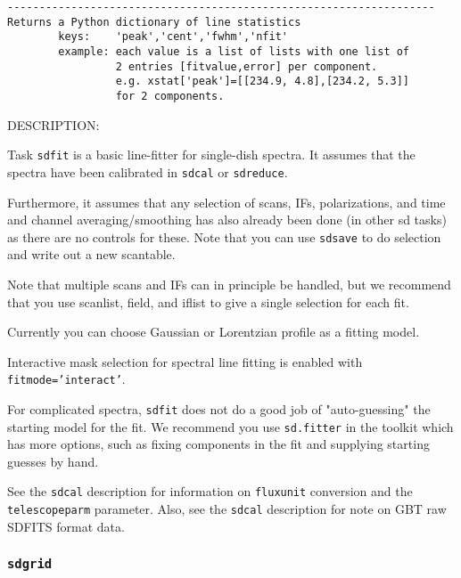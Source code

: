 \begin{verbatim}
-------------------------------------------------------------------
Returns a Python dictionary of line statistics
        keys:    'peak','cent','fwhm','nfit'
        example: each value is a list of lists with one list of
                 2 entries [fitvalue,error] per component.
                 e.g. xstat['peak']=[[234.9, 4.8],[234.2, 5.3]]
                 for 2 components.

\end{verbatim}

DESCRIPTION:

Task {\tt sdfit} is a basic line-fitter for single-dish spectra.
It assumes that the spectra have been calibrated in {\tt sdcal}
or {\tt sdreduce}.

Furthermore, it assumes that any selection of scans, IFs,
polarizations, and time and channel averaging/smoothing has
also already been done (in other sd tasks) as there are no controls
for these.  Note that you can use {\tt sdsave} to do selection and write
out a new scantable.

Note that multiple scans and IFs can in principle be handled, but
we recommend that you use scanlist, field, and iflist to give a
single selection for each fit.

Currently you can choose Gaussian or Lorentzian profile as a fitting model.
    
Interactive mask selection for spectral line fitting is enabled with
{\tt fitmode='interact'}. 
    
For complicated spectra, {\tt sdfit} does not do a good job of
"auto-guessing" the starting model for the fit.  We recommend
you use {\tt sd.fitter} in the toolkit which has more options, such
as fixing components in the fit and supplying starting guesses
by hand.

See the {\tt sdcal} description for information on {\tt fluxunit} 
conversion and the {\tt telescopeparm} parameter.
Also, see the {\tt sdcal} description for note on GBT raw SDFITS format data.

\subsubsection{{\tt sdgrid}}
\label{section::sd.sdtasks.tasks.sdgrid}

